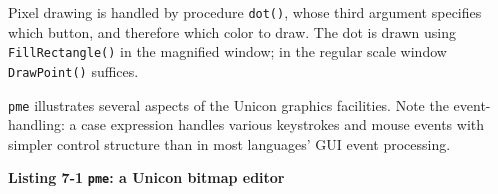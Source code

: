 Pixel drawing is handled by procedure \texttt{dot()}, whose third
argument specifies which button, and therefore which color to draw.
The dot is drawn using \texttt{FillRectangle()} in the magnified window;
in the regular scale window \texttt{DrawPoint()} suffices.


\texttt{pme} illustrates several aspects of the Unicon graphics
facilities. Note the event-handling: a case expression handles various
keystrokes and mouse events with simpler control structure than in
most languages' GUI event processing.

\bigskip

{\sffamily\bfseries Listing 7-1}
{\sffamily\bfseries \texttt{pme}: a Unicon bitmap editor}

